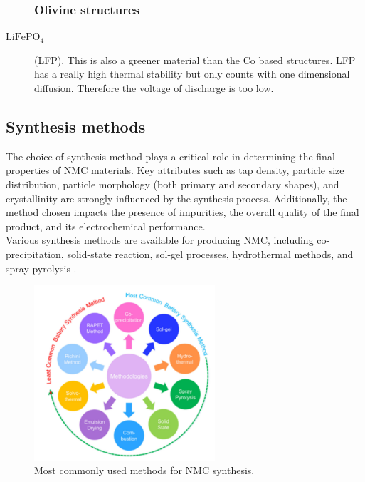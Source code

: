 \documentclass{article}
\begin{document}
\begin{description}
  \subsubsection{Olivine structures}
  \item[$\text{LiFePO}_{4}$](LFP). This is also a greener material than the 
  Co based structures. LFP has a really high thermal stability but only counts
  with one dimensional diffusion. Therefore the voltage of discharge
  is too low.\cite{Olivine} \\
\end{description}

\subsection{Synthesis methods}
The choice of synthesis method plays a critical role in determining the final properties of NMC materials. Key attributes such as tap density, particle size distribution, particle morphology (both primary and secondary shapes), and crystallinity are strongly influenced by the synthesis process. Additionally, the method chosen impacts the presence of impurities, the overall quality of the final product, and its electrochemical performance. \\

Various synthesis methods are available for producing NMC, including co-precipitation, solid-state reaction, sol-gel processes, hydrothermal methods, and spray pyrolysis \cite{process}. 
\begin{figure}[H]
  \centering
  \includegraphics[width=0.6\textwidth]{synthesis.png}
  \caption{Most commonly used methods for NMC synthesis.}
  \label{fig:synthesis}
\end{figure}
\end{document}
